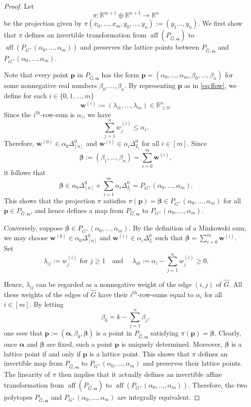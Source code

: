 \documentclass[11pt,a4paper]{article}
\newcommand{\vct}[1]{\boldsymbol{#1}}
\newcommand{\R}{\mathbb{R}}
\newcommand{\aff}{\operatorname{aff}}
\newcommand{\1}{\mathbf{1}}
\theoremstyle{plain}
\theoremstyle{definition}
\begin{document}
\begin{proof} Let
\[
\pi:\R^{m+1}\oplus\R^{n+1}\longrightarrow\R^{n}
\]
be the projection given by $\pi(x_0,\dots, x_m,y_0,\dots, y_n) := (y_1\dots, y_n)$. We first show that $\pi$ defines an invertible transformation from $\aff(P_{\widehat G,\vct{\alpha}})$ to $\aff(P_{G^+}(\alpha_0,\dots,\alpha_m))$ and preserves the lattice points between $P_{\widehat G,\vct{\alpha}}$ and $P_{G^+}(\alpha_0,\dots,\alpha_m)$. 

Note that every point $\vct{p}$ in $P_{\widehat G,\vct{\alpha}}$
 has the form $\vct{p}=(\alpha_0,\dots,\alpha_m,\beta_0,\dots, \beta_n)$
 for some nonnegative real numbers $\beta_0,\dots, \beta_n.$ By representing $\vct{p}$ as in \eqref{eq:flow}, we define for each $i\in\{0,1,\ldots,m\}$
\[
\vct{w}^{(i)}:=(\lambda_{i1},\ldots,\lambda_{in})\in\R_{\ge0}^n.
\]
Since the $i^{\mathrm{th}}$-row-sum is $\alpha_i$, we have
\[
\sum_{j=1}^n w_j^{(i)}\le\alpha_i.
\]
Therefore,
$\vct{w}^{(0)}\in\alpha_0\Delta_{[n]}^0$ and $\vct{w}^{(i)}\in\alpha_i\Delta_{I_i}^0$ for all $i\in [m]$. Since
\[
\vct{\beta}:=(\beta_1,\ldots,\beta_n)
=\sum_{i=0}^m\vct{w}^{(i)},
\]
it follows that
\[
\vct{\beta}
\in\alpha_0\Delta_{[n]}^0+\sum_{i=1}^m\alpha_i\Delta_{I_i}^0
=P_{G^+}(\alpha_0,\ldots,\alpha_m).
\]
This shows that the projection $\pi$ satisfies $\pi(\vct{p}) = \vct{\beta} \in P_{G^+}(\alpha_0,\dots, \alpha_m)$ for all $\vct{p} \in P_{\widehat G,\vct{\alpha}}$, and hence defines a map from $P_{\widehat G,\vct{\alpha}}$ to $P_{G^+}(\alpha_0,\dots, \alpha_m).$ 

Conversely, suppose
$\vct{\beta}\in P_{G^+}(\alpha_0,\ldots,\alpha_m).$ By the definition of a Minkowski sum, we may choose $\vct{w}^{(0)}\in\alpha_0\Delta_{[n]}^0$ and $
\vct{w}^{(i)}\in\alpha_i\Delta_{I_i}^0$
such that $\vct{\beta}=\sum^m_{i=0}\vct{w}^{(i)}$. Set
\[
\lambda_{ij}:=w_j^{(i)} \text{ for }j\ge1
\quad \text{and } \quad
\lambda_{i0}:=\alpha_i-\sum_{j=1}^n w_j^{(i)}\ge0.
\]

Hence, $\lambda_{ij}$ can be regarded as a nonnegative weight of the edge $(i,j)$ of $\widehat G$. All these weights of the edges of $\widehat G$ have their $i^{\mathrm{th}}$-row-sums equal to $\alpha_i$ for all $i \in [m]$. By letting
\[
\beta_0=k-\sum_{j=1}^n\beta_j,
\]
one sees that $\vct{p}:=(\vct{\alpha},\beta_0,\vct{\beta})$ is a point in $P_{\widehat G, \vct{\alpha}}$ satisfying $\pi(\vct{p}) = \vct{\beta}.$  Clearly, once $\vct{\alpha}$ and $\vct{\beta}$ are fixed, such a point $\vct{p}$ is uniquely determined. Moreover, $\vct{\beta}$ is a lattice point if and only if $\vct{p}$ is a lattice point. This shows that $\pi$ defines an invertible map from  $P_{\widehat G,\vct{\alpha}}$ to $P_{G^+}(\alpha_0,\dots, \alpha_m)$ and preserves their lattice points. The linearity of $\pi$ then implies that it actually defines an invertible affine transformation from $\aff(P_{\widehat G,\vct{\alpha}})$ to $\aff(P_{G^+}(\alpha_0,\dots,\alpha_m))$. Therefore, the two polytopes $P_{\widehat G,\vct{\alpha}}$ and $P_{G^+}(\alpha_0,\dots,\alpha_m)$ are integrally equivalent.



\end{proof}
\end{document}

